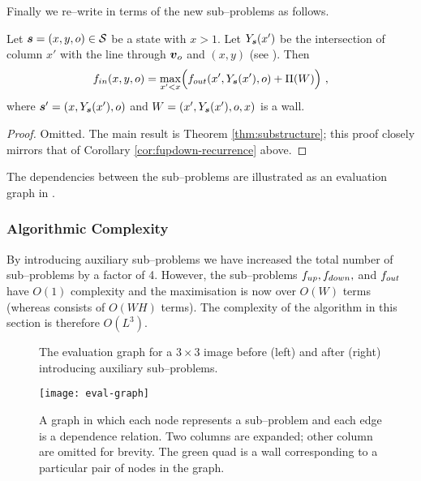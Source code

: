 Finally we re--write  in terms of the new
sub--problems as follows.

\begin{corollary}
  \label{cor:fin-recurrence-second}
  Let $\State=(x,y,\WallOrient)\in\StateSpace$ be a state with
  $x>1$. Let $Y_{\State}(x')$ be the intersection of column $x'$ with
  the line through $\vpt_{\WallOrient}$ and $(x,y)$ (see
  ). Then
  \begin{equation}
    \label{eq:fin-recurrence-second}
    \SubProbIN(x,y,\WallOrient) =
    \max_{x'<x}\limits
    \Bigl(
    \SubProbOUT(x',Y_{\State}(x'),\WallOrient) + \WallPayoff(\Wall)
    \Bigr) ~,
  \end{equation}
  where $\State'=(x,Y_{\State}(x'),\WallOrient)$ and
  $\Wall=(x',Y_{\State}(x'),\WallOrient,x)$ is a wall.
\end{corollary}
\begin{proof}
  Omitted. The main result is Theorem \ref{thm:substructure}; this proof
  closely mirrors that of Corollary \ref{cor:fupdown-recurrence} above.
\end{proof}

The dependencies between the sub--problems are illustrated as an
evaluation graph in .

\subsubsection{Algorithmic Complexity}

By introducing auxiliary sub--problems we have increased the total
number of sub--problems by a factor of 4. However, the sub--problems
$\SubProbUP, \SubProbDOWN,$ and $\SubProbOUT$ have $O(1)$ complexity
and the maximisation  is now over $O(W)$
terms (whereas  consists of $O(WH)$
terms). The complexity of the algorithm in this section is therefore
$O(L^3)$.

\begin{figure}[tb]%
  \centering
  \qquad
  \caption{The evaluation graph for a $3 \times 3$ image before (left)
    and after (right) introducing auxiliary sub--problems.}
  \label{fig:evaluation-graphs}
\end{figure}

\begin{figure}
  \centering
  \texttt{[image: eval-graph]}
  \label{fig:eval-graph}
  \caption{A graph in which each node represents a
    sub--problem and each edge is a dependence relation. Two columns
    are expanded; other column are omitted for brevity. The green quad
    is a wall corresponding to a particular pair of nodes in the
    graph.}
\end{figure}

